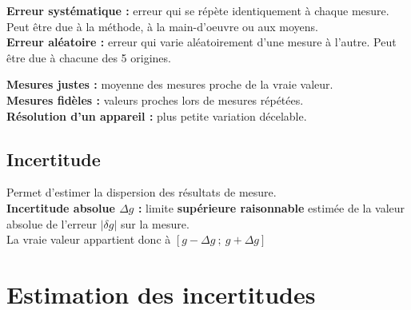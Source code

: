 \documentclass[13pt, twoside, a4paper, french]{report}
\begin{document}
      \begin{minipage}[t]{0.50\textwidth}%
        \textbf{Erreur systématique :} erreur qui se répète identiquement à chaque mesure.
        Peut être due à la méthode, à la main-d'oeuvre ou aux moyens.\\

        \textbf{Erreur aléatoire :} erreur qui varie aléatoirement d'une mesure à l'autre.
        Peut être due à chacune des 5 origines.
      \end{minipage}\hspace{0.03\textwidth}
      \begin{minipage}[t]{0.47\textwidth}%
        \textbf{Mesures justes :} moyenne des mesures proche de la vraie valeur.\\
        \textbf{Mesures fidèles :} valeurs proches lors de mesures répétées.\\
        \textbf{Résolution d’un appareil :} plus petite variation décelable.
      \end{minipage}

    \subsection{Incertitude}\label{subsec:incertitude}

      Permet d’estimer la dispersion des résultats de mesure.\\

      \textbf{Incertitude absolue $\Delta g$ :} limite \textbf{supérieure raisonnable} estimée de la valeur absolue de l’erreur $\lvert \delta g \rvert$ sur la mesure.\\ La vraie valeur appartient donc à $[g - \Delta g\ ;\ g + \Delta g]$


  \section{Estimation des incertitudes}\label{sec:estimation-des-incertitudes}
\end{document}
